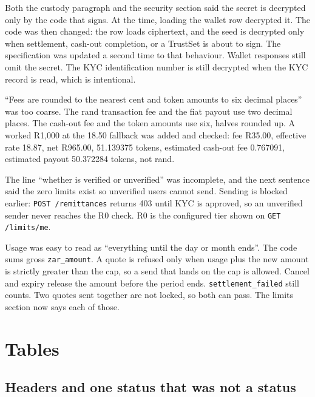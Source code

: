 \documentclass[11pt,a4paper]{article}
\begin{document}
\begin{description}[leftmargin=0pt,style=nextline,font=\normalfont\bfseries]
\item[Private keys decrypted only by the signer.]
Both the custody paragraph and the security section said the secret is decrypted only by the code that signs.
At the time, loading the wallet row decrypted it.
The code was then changed: the row loads ciphertext, and the seed is decrypted only when settlement, cash-out completion, or a TrustSet is about to sign.
The specification was updated a second time to that behaviour.
Wallet responses still omit the secret.
The KYC identification number is still decrypted when the KYC record is read, which is intentional.

\item[Rounding.]
``Fees are rounded to the nearest cent and token amounts to six decimal places'' was too coarse.
The rand transaction fee and the fiat payout use two decimal places.
The cash-out fee and the token amounts use six, halves rounded up.
A worked R1{,}000 at the 18.50 fallback was added and checked: fee R35.00, effective rate 18.87, net R965.00, 51.139375 tokens, estimated cash-out fee 0.767091, estimated payout 50.372284 tokens, not rand.

\item[Who the limits apply to, and what R0 does.]
The line ``whether is verified or unverified'' was incomplete, and the next sentence said the zero limits exist so unverified users cannot send.
Sending is blocked earlier: \texttt{POST /remittances} returns 403 until KYC is approved, so an unverified sender never reaches the R0 check.
R0 is the configured tier shown on \texttt{GET /limits/me}.

\item[What counts toward the cap.]
Usage was easy to read as ``everything until the day or month ends''.
The code sums gross \texttt{zar\_amount}.
A quote is refused only when usage plus the new amount is strictly greater than the cap, so a send that lands on the cap is allowed.
Cancel and expiry release the amount before the period ends.
\texttt{settlement\_failed} still counts.
Two quotes sent together are not locked, so both can pass.
The limits section now says each of those.

\end{description}

\section{Tables}

\subsection{Headers and one status that was not a status}
\end{document}
